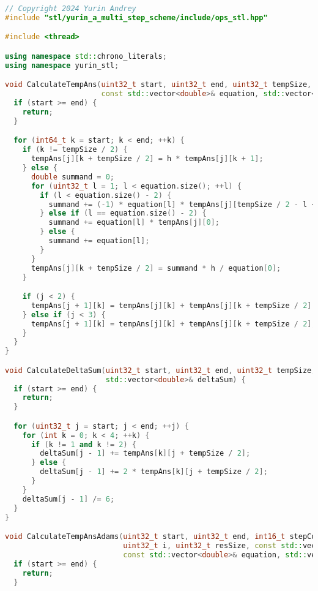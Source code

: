 \documentclass{report}
\begin{document}
\begin{lstlisting}[language=C++,caption=STL версия]
// Copyright 2024 Yurin Andrey
#include "stl/yurin_a_multi_step_scheme/include/ops_stl.hpp"

#include <thread>

using namespace std::chrono_literals;
using namespace yurin_stl;

void CalculateTempAns(uint32_t start, uint32_t end, uint32_t tempSize, uint32_t j, double h,
                      const std::vector<double>& equation, std::vector<std::vector<double>>& tempAns) {
  if (start >= end) {
    return;
  }

  for (int64_t k = start; k < end; ++k) {
    if (k != tempSize / 2) {
      tempAns[j][k + tempSize / 2] = h * tempAns[j][k + 1];
    } else {
      double summand = 0;
      for (uint32_t l = 1; l < equation.size(); ++l) {
        if (l < equation.size() - 2) {
          summand += (-1) * equation[l] * tempAns[j][tempSize / 2 - l + 1];
        } else if (l == equation.size() - 2) {
          summand += equation[l] * tempAns[j][0];
        } else {
          summand += equation[l];
        }
      }
      tempAns[j][k + tempSize / 2] = summand * h / equation[0];
    }

    if (j < 2) {
      tempAns[j + 1][k] = tempAns[j][k] + tempAns[j][k + tempSize / 2] / 2;
    } else if (j < 3) {
      tempAns[j + 1][k] = tempAns[j][k] + tempAns[j][k + tempSize / 2];
    }
  }
}

void CalculateDeltaSum(uint32_t start, uint32_t end, uint32_t tempSize, const std::vector<std::vector<double>>& tempAns,
                       std::vector<double>& deltaSum) {
  if (start >= end) {
    return;
  }

  for (uint32_t j = start; j < end; ++j) {
    for (int k = 0; k < 4; ++k) {
      if (k != 1 and k != 2) {
        deltaSum[j - 1] += tempAns[k][j + tempSize / 2];
      } else {
        deltaSum[j - 1] += 2 * tempAns[k][j + tempSize / 2];
      }
    }
    deltaSum[j - 1] /= 6;
  }
}

void CalculateTempAnsAdams(uint32_t start, uint32_t end, int16_t stepCount, uint32_t ind, uint32_t offset, double h,
                           uint32_t i, uint32_t resSize, const std::vector<std::vector<double>>& res,
                           const std::vector<double>& equation, std::vector<std::vector<double>>& tempAns) {
  if (start >= end) {
    return;
  }


\end{lstlisting}
\end{document}
